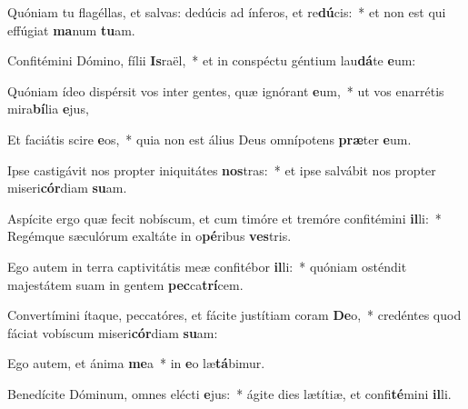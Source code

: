 \item Quóniam tu flagéllas, et salvas: dedúcis ad ínferos, et re\textbf{dú}cis:~* et non est qui effúgiat \textbf{ma}num \textbf{tu}am.
\item Confitémini Dómino, fílii \textbf{Is}raël,~* et in conspéctu géntium lau\textbf{dá}te \textbf{e}um:
\item Quóniam ídeo dispérsit vos inter gentes, quæ ignórant \textbf{e}um,~* ut vos enarrétis mira\textbf{bí}lia \textbf{e}jus,
\item Et faciátis scire \textbf{e}os,~* quia non est álius Deus omnípotens \textbf{præ}ter \textbf{e}um.
\item Ipse castigávit nos propter iniquitátes \textbf{nos}tras:~* et ipse salvábit nos propter miseri\textbf{cór}diam \textbf{su}am.
\item Aspícite ergo quæ fecit nobíscum, et cum timóre et tremóre confitémini \textbf{il}li:~* Regémque sæculórum exaltáte in o\textbf{pé}ribus \textbf{ves}tris.
\item Ego autem in terra captivitátis meæ confitébor \textbf{il}li:~* quóniam osténdit majestátem suam in gentem \textbf{pec}ca\textbf{trí}cem.
\item Convertímini ítaque, peccatóres, et fácite justítiam coram \textbf{De}o,~* credéntes quod fáciat vobíscum miseri\textbf{cór}diam \textbf{su}am:
\item Ego autem, et ánima \textbf{me}a~* in \textbf{e}o læ\textbf{tá}bimur.
\item Benedícite Dóminum, omnes elécti \textbf{e}jus:~* ágite dies lætítiæ, et confi\textbf{té}mini \textbf{il}li.
